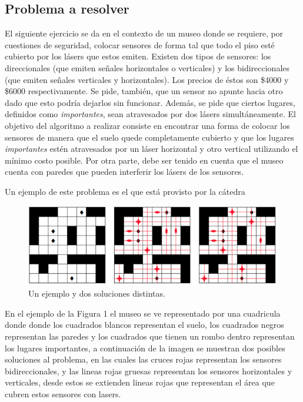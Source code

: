 \subsection{Problema a resolver}

El siguiente ejercicio se da en el contexto de un museo donde se requiere, por cuestiones de seguridad, colocar sensores de forma tal que todo el piso esté cubierto por los lásers que estos emiten. Existen dos tipos de sensores: los direccionales (que emiten señales horizontales o verticales) y los bidireccionales (que emiten señales verticales y horizontales). Los precios de éstos son \$4000 y \$6000 respectivamente. Se pide, también, que un sensor no apunte hacia otro dado que esto podría dejarlos sin funcionar. Además, se pide que ciertos lugares, definidos como \textit{importantes}, sean atravesados por dos lásers simultáneamente. El objetivo del algoritmo a realizar consiste en encontrar una forma de colocar los sensores de manera que el suelo quede completamente cubierto y que los lugares \textit{importantes} estén atravesados por un láser horizontal y otro vertical utilizando el mínimo costo posible. Por otra parte, debe ser tenido en cuenta que el museo cuenta con paredes que pueden interferir los lásers de los sensores.

Un ejemplo de este problema es el que está provisto por la cátedra

\begin{figure}[H]
	\begin{center}
		\includegraphics[width=320pt]{../imgs/ej3_ejemploCatedra.png}
	\end{center}
\caption{Un ejemplo y dos soluciones distintas.}
\end{figure}

En el ejemplo de la Figura 1 el museo se ve representado por una cuadricula donde donde los cuadrados blancos representan el suelo, los cuadrados negros representan las paredes y los cuadrados que tienen un rombo dentro representan los lugares importantes, a continuación de la imagen se muestran dos posibles soluciones al problema, en las cuales las cruces rojas representan los sensores bidireccionales, y las lineas rojas gruesas representan los sensores horizontales y verticales, desde estos se extienden lineas rojas que representan el área que cubren estos sensores con lasers.

